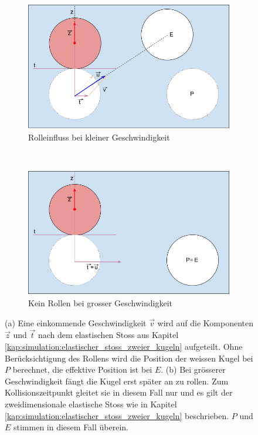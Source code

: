 \begin{figure}[h!]
    \centering
    \begin{subfigure}[b]{0.6\textwidth}
        \includegraphics[width=1\textwidth]{../common/03_billiard_ai/resources/33_rollen_kleine_geschwindigkeit.png}
        \caption{Rolleinfluss bei kleiner Geschwindigkeit}
        \label{fig:rollen_kleine_geschwindigkeit}
    \end{subfigure}\\
    \begin{subfigure}[b]{0.6\textwidth}
        \includegraphics[width=1\textwidth]{../common/03_billiard_ai/resources/34_gleiten_grosse_geschwindigkeit.png}
        \caption{Kein Rollen bei grosser Geschwindigkeit}
        \label{fig:gleiten_grosse_geschwindigkeit}
    \end{subfigure}
    \caption{(a) Eine einkommende Geschwindigkeit $\vec{v}$ wird auf die Komponenten $\vec{z}$ und $\vec{t}$ nach dem
    elastischen Stoss aus Kapitel \ref{kap:simulation:elastischer_stoss_zweier_kugeln} aufgeteilt.
    Ohne Berücksichtigung des Rollens wird die Position der weissen Kugel bei $P$ berechnet, die effektive Position ist bei $E$.
        (b) Bei grösserer Geschwindigkeit fängt die Kugel erst später an zu rollen. Zum Kollisionszeitpunkt gleitet sie
        in diesem Fall nur und es gilt der zweidimensionale elastische Stoss wie in
        Kapitel \ref{kap:simulation:elastischer_stoss_zweier_kugeln} beschrieben.
        $P$ und $E$ stimmen in diesem Fall überein.}
    \label{fig:einfluss_rollen}
\end{figure}

